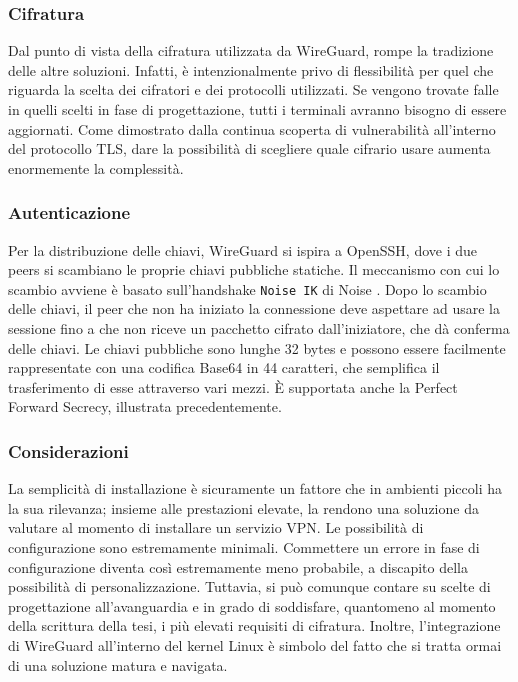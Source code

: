 \subsubsection{Cifratura}
Dal punto di vista della cifratura utilizzata da WireGuard, rompe la tradizione delle altre soluzioni. Infatti, è intenzionalmente privo di flessibilità per quel che riguarda la scelta dei cifratori e dei protocolli utilizzati. Se vengono trovate falle in quelli scelti in fase di progettazione, tutti i terminali avranno bisogno di essere aggiornati. Come dimostrato dalla continua scoperta di vulnerabilità all'interno del protocollo TLS, dare la possibilità di scegliere quale cifrario usare aumenta enormemente la complessità.

\subsubsection{Autenticazione}
Per la distribuzione delle chiavi, WireGuard si ispira a OpenSSH, dove i due peers si scambiano le proprie chiavi pubbliche statiche. Il meccanismo con cui lo scambio avviene è basato sull'handshake \texttt{Noise IK} di Noise \cite{Noise}. Dopo lo scambio delle chiavi, il peer che non ha iniziato la connessione deve aspettare ad usare la sessione fino a che non riceve un pacchetto cifrato dall'iniziatore, che dà conferma delle chiavi.
Le chiavi pubbliche sono lunghe 32 bytes e possono essere facilmente rappresentate con una codifica Base64 in 44 caratteri, che semplifica il trasferimento di esse attraverso vari mezzi. È supportata anche la Perfect Forward Secrecy, illustrata precedentemente.

\subsubsection{Considerazioni}
La semplicità di installazione è sicuramente un fattore che in ambienti piccoli ha la sua rilevanza; insieme alle prestazioni elevate, la rendono una soluzione da valutare al momento di installare un servizio VPN.
Le possibilità di configurazione sono estremamente minimali. Commettere un errore in fase di configurazione diventa così estremamente meno probabile, a discapito della possibilità di personalizzazione.
Tuttavia, si può comunque contare su scelte di progettazione all'avanguardia e in grado di soddisfare, quantomeno al momento della scrittura della tesi, i più elevati requisiti di cifratura.
Inoltre, l'integrazione di WireGuard all'interno del kernel Linux è simbolo del fatto che si tratta ormai di una soluzione matura e navigata.